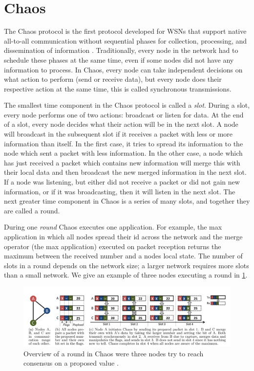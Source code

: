\section{Chaos}
The Chaos protocol is the first protocol developed for WSNs that support native all-to-all communication without sequential phases for collection, processing, and dissemination of information \cite{chaos-introduction-paper}. Traditionally, every node in the network had to schedule these phases at the same time, even if some nodes did not have any information to process. In Chaos, every node can take independent decisions on what action to perform (send or receive data), but every node does their respective action at the same time, this is called synchronous transmissions.


The smallest time component in the Chaos protocol is called a \textit{slot}. During a slot, every node performs one of two actions: broadcast or listen for data. At the end of a slot, every node decides what their action will be in the next slot.
A node will broadcast in the subsequent slot if it receives a packet with less or more information than itself. In the first case, it tries to spread its information to the node which sent a packet with less information. In the other case, a node which has just received a packet which contains new information will merge this with their local data and then broadcast the new merged information in the next slot. If a node was listening, but either did not receive a packet or did not gain new information, or if it was broadcasting, then it will listen in the next slot. The next greater time component in Chaos is a series of many slots, and together they are called a round.

During one \textit{round} Chaos executes one application. For example, the max application in which all nodes spread their id across the network and the merge operator (the max application) executed on packet reception returns the maximum between the received number and a nodes local state. The number of slots in a round depends on the network size; a larger network requires more slots than a small network. We give an example of three nodes executing a round in  \cref{fig:chaos-overview}.

\begin{figure}[bt]
    \centering
    \includegraphics[width=\textwidth]{figure/ChaosOverview.png}
    \caption{Overview of a round in Chaos were three nodes try to reach consensus on a proposed value \cite{chaos-introduction-paper}.}
    \label{fig:chaos-overview}
\end{figure}

